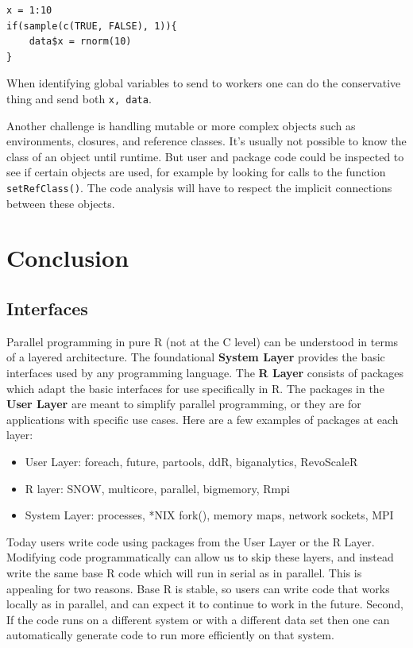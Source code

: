 \documentclass[12pt]{article}
\begin{document}
\begin{verbatim}
x = 1:10
if(sample(c(TRUE, FALSE), 1)){
    data$x = rnorm(10)
}
\end{verbatim}

When identifying global variables to send to workers one can do the
conservative thing and send both \texttt{x, data}.

Another challenge is handling mutable or more complex objects
such as environments, closures, and reference classes.  It's usually not
possible to know the class of an object until runtime. But user and package
code could be inspected to see if certain objects are used, for example by
looking for calls to the function \texttt{setRefClass()}. The code
analysis will have to respect the implicit connections between these
objects.

\section{Conclusion}

\subsection{Interfaces}

Parallel programming in pure R (not at the C level) can be understood in
terms of a layered architecture. The foundational \textbf{System Layer}
provides the basic interfaces used by any programming language. The
\textbf{R Layer} consists of packages which adapt the basic interfaces for
use specifically in R. The packages in the \textbf{User Layer} are meant to
simplify parallel programming, or they are for applications with specific
use cases.  Here are a few examples of packages at each layer:

\begin{itemize}
\item User Layer: foreach, future, partools, ddR, biganalytics, RevoScaleR
\item R layer: SNOW, multicore, parallel, bigmemory, Rmpi
\item System Layer: processes, *NIX fork(), memory maps, network sockets,
    MPI
\end{itemize}

Today users write code using packages from the User Layer or the R Layer.
Modifying code programmatically can allow us to skip these layers, and
instead write the same base R code which will run in serial as in parallel.
This is appealing for two reasons. Base R is stable, so users can write
code that works locally as in parallel, and can expect it to continue to
work in the future. Second, If the code runs on a different system or with
a different data set then one can automatically generate code to run more
efficiently on that system.
\end{document}

